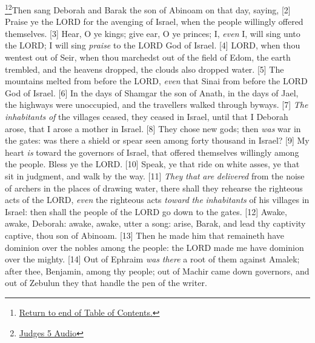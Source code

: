 \footnote{\textcolor[rgb]{0.00,0.25,0.00}{\hyperlink{JudgesTOC}{Return to end of Table of Contents.}}}\footnote{\href{https://audiobible.com/bible/judges_5.html}{\textcolor[cmyk]{0.99998,1,0,0}{Judges 5 Audio}}}\textcolor[cmyk]{0.99998,1,0,0}{Then sang Deborah and Barak the son of Abinoam on that day, saying,}
[2] \textcolor[cmyk]{0.99998,1,0,0}{Praise ye the LORD for the avenging of Israel, when the people willingly offered themselves.}
[3] \textcolor[cmyk]{0.99998,1,0,0}{Hear, O ye kings; give ear, O ye princes; I, \emph{even} I, will sing unto the LORD; I will sing \emph{praise} to the LORD God of Israel.}
[4] \textcolor[cmyk]{0.99998,1,0,0}{LORD, when thou wentest out of Seir, when thou marchedst out of the field of Edom, the earth trembled, and the heavens dropped, the clouds also dropped water.}
[5] \textcolor[cmyk]{0.99998,1,0,0}{The mountains melted from before the LORD, \emph{even} that Sinai from before the LORD God of Israel.}
[6] \textcolor[cmyk]{0.99998,1,0,0}{In the days of Shamgar the son of Anath, in the days of Jael, the highways were unoccupied, and the travellers walked through byways.}
[7] \textcolor[cmyk]{0.99998,1,0,0}{\emph{The} \emph{inhabitants} \emph{of} the villages ceased, they ceased in Israel, until that I Deborah arose, that I arose a mother in Israel.}
[8] \textcolor[cmyk]{0.99998,1,0,0}{They chose new gods; then \emph{was} war in the gates: was there a shield or spear seen among forty thousand in Israel?}
[9] \textcolor[cmyk]{0.99998,1,0,0}{My heart \emph{is} toward the governors of Israel, that offered themselves willingly among the people. Bless ye the LORD.}
[10] \textcolor[cmyk]{0.99998,1,0,0}{Speak, ye that ride on white asses, ye that sit in judgment, and walk by the way.}
[11] \textcolor[cmyk]{0.99998,1,0,0}{\emph{They} \emph{that} \emph{are} \emph{delivered} from the noise of archers in the places of drawing water, there shall they rehearse the righteous acts of the LORD, \emph{even} the righteous acts \emph{toward} \emph{the} \emph{inhabitants} of his villages in Israel: then shall the people of the LORD go down to the gates.}
[12] \textcolor[cmyk]{0.99998,1,0,0}{Awake, awake, Deborah: awake, awake, utter a song: arise, Barak, and lead thy captivity captive, thou son of Abinoam.}
[13] \textcolor[cmyk]{0.99998,1,0,0}{Then he made him that remaineth have dominion over the nobles among the people: the LORD made me have dominion over the mighty.}
[14] \textcolor[cmyk]{0.99998,1,0,0}{Out of Ephraim \emph{was} \emph{there} a root of them against Amalek; after thee, Benjamin, among thy people; out of Machir came down governors, and out of Zebulun they that handle the pen of the writer.}
